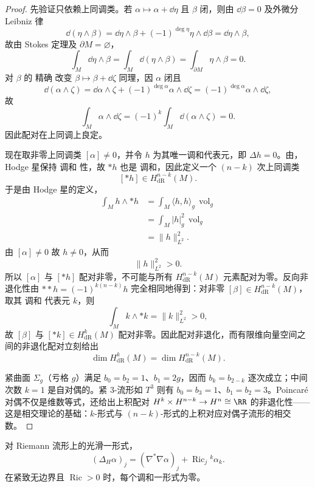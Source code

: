 \begin{proof}
先验证只依赖上同调类。若 $\alpha\mapsto\alpha+\dd\eta$ 且 $\beta$ 闭，则由 $\dd\beta=0$ 及外微分 Leibniz 律
\[
\dd(\eta\wedge\beta)
=\dd\eta\wedge\beta+(-1)^{\deg\eta}\eta\wedge\dd\beta
=\dd\eta\wedge\beta,
\]
故由 Stokes 定理及 $\partial M=\varnothing$，
\[
\int_M\dd\eta\wedge\beta
=\int_M\dd(\eta\wedge\beta)
=\int_{\partial M}\eta\wedge\beta
=0.
\]
对 $\beta$ 的 精确 改变 $\beta\mapsto\beta+\dd\zeta$ 同理，因 $\alpha$ 闭且
\[
\dd(\alpha\wedge\zeta)
=\dd\alpha\wedge\zeta+(-1)^{\deg\alpha}\alpha\wedge\dd\zeta
=(-1)^{\deg\alpha}\alpha\wedge\dd\zeta,
\]
故
\[
\int_M\alpha\wedge\dd\zeta
=(-1)^k\int_M\dd(\alpha\wedge\zeta)=0.
\]
因此配对在上同调上良定。

现在取非零上同调类 $[\alpha]\neq0$，并令 $h$ 为其唯一调和代表元，即 $\Delta h=0$。由，Hodge 星保持 调和 性，故 $*h$ 也是 调和，因此定义一个 $(n-k)$ 次上同调类
\[
[*h]\in H^{n-k}_{\mathrm{dR}}(M).
\]
于是由 Hodge 星的定义，
\begin{align*}
\int_M h\wedge *h
&=\int_M \langle h,h\rangle_g\,\operatorname{vol}_g\\
&=\int_M |h|_g^2\,\operatorname{vol}_g\\
&=\|h\|_{L^2}^2.
\end{align*}
由 $[\alpha]\neq0$ 故 $h\neq0$，从而
\[
\|h\|_{L^2}^2>0.
\]
所以 $[\alpha]$ 与 $[*h]$ 配对非零，不可能与所有 $H^{n-k}_{\mathrm{dR}}(M)$ 元素配对为零。反向非退化性由 $**h=(-1)^{k(n-k)}h$ 完全相同地得到：对非零 $[\beta]\in H^{n-k}_{\mathrm{dR}}(M)$，取其 调和 代表元 $k$，则
\[
\int_M k\wedge *k=\|k\|_{L^2}^2>0,
\]
故 $[\beta]$ 与 $[*k]\in H^k_{\mathrm{dR}}(M)$ 配对非零。因此配对非退化，而有限维向量空间之间的非退化配对立刻给出
\[
\dim H^k_{\mathrm{dR}}(M)
=\dim H^{n-k}_{\mathrm{dR}}(M).
\]

紧曲面 $\Sigma_g$（亏格 $g$）满足 $b_0=b_2=1$、$b_1=2g$，因而 $b_k=b_{2-k}$ 逐次成立；中间次数 $k=1$ 是自对偶的。紧 3-流形如 $T^3$ 则有 $b_0=b_3=1$、$b_1=b_2=3$。Poincaré 对偶不仅是维数等式，还给出上积配对 $H^k\times H^{n-k}\to H^n\cong\RR$ 的非退化性——这是相交理论的基础：$k$-形式与 $(n-k)$-形式的上积对应对偶子流形的相交数。
\end{proof}

\begin{proposition}
对 Riemann 流形上的光滑一形式，\[(\Delta_H\alpha)_j=(\nabla^*\nabla\alpha)_j+\operatorname{Ric}_j{}^k\alpha_k.\]在紧致无边界且 $\operatorname{Ric}>0$ 时，每个调和一形式为零。
\end{proposition}

